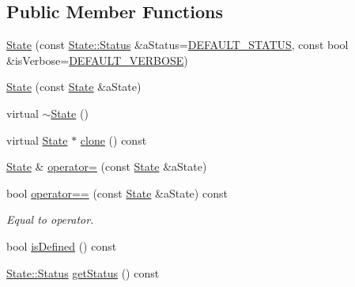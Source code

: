\subsection*{Public Member Functions}
\begin{DoxyCompactItemize}
\item 
\hyperlink{classostk_1_1simulation_1_1component_1_1_state_aef1526b3513a2165970420e7ac8b6dae}{State} (const \hyperlink{classostk_1_1simulation_1_1component_1_1_state_adb8b51feaa29b0ebd5fc7977fada7e58}{State\+::\+Status} \&a\+Status=\hyperlink{_state_8hpp_a188ce67e515b427589d4c363d1132018}{D\+E\+F\+A\+U\+L\+T\+\_\+\+S\+T\+A\+T\+US}, const bool \&is\+Verbose=\hyperlink{_state_8hpp_a4ad8faebfc1723fec1090b84ec0f680e}{D\+E\+F\+A\+U\+L\+T\+\_\+\+V\+E\+R\+B\+O\+SE})
\item 
\hyperlink{classostk_1_1simulation_1_1component_1_1_state_a36adbe9bccb78bec881e2c3f267724ed}{State} (const \hyperlink{classostk_1_1simulation_1_1component_1_1_state}{State} \&a\+State)
\item 
virtual \hyperlink{classostk_1_1simulation_1_1component_1_1_state_a57c4cf4d8c50c2482402e3740483c29e}{$\sim$\+State} ()
\item 
virtual \hyperlink{classostk_1_1simulation_1_1component_1_1_state}{State} $\ast$ \hyperlink{classostk_1_1simulation_1_1component_1_1_state_a32e9b1349918070f114cb38e61828897}{clone} () const
\item 
\hyperlink{classostk_1_1simulation_1_1component_1_1_state}{State} \& \hyperlink{classostk_1_1simulation_1_1component_1_1_state_ac8aaea99357f670afab3c087de08446f}{operator=} (const \hyperlink{classostk_1_1simulation_1_1component_1_1_state}{State} \&a\+State)
\item 
bool \hyperlink{classostk_1_1simulation_1_1component_1_1_state_ad4440388904bac640dc57ffbc5b77019}{operator==} (const \hyperlink{classostk_1_1simulation_1_1component_1_1_state}{State} \&a\+State) const
\begin{DoxyCompactList}\small\item\em Equal to operator. \end{DoxyCompactList}\item 
bool \hyperlink{classostk_1_1simulation_1_1component_1_1_state_abfb0349ee570125276b52aa2c3b1156d}{is\+Defined} () const
\item 
\hyperlink{classostk_1_1simulation_1_1component_1_1_state_adb8b51feaa29b0ebd5fc7977fada7e58}{State\+::\+Status} \hyperlink{classostk_1_1simulation_1_1component_1_1_state_a5ff60e1d912483effdb53b2b5c555cf9}{get\+Status} () const
\end{DoxyCompactItemize}
